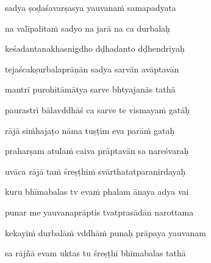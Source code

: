 sadya ṣoḍaśavarṣasya yauvana\.m samapadyata\thinspace{\dandab} \dontdisplaylinenum

na valīpalita\.m sadyo na jarā na ca durbalaḥ \veg\dontdisplaylinenum

keśadantanakhasnigdho dḍhadanto dḍhendriyaḥ\thinspace{\dandab} \dontdisplaylinenum

tejaścakṣurbalaprāṇān sadya sarvān avāptavān \veg\dontdisplaylinenum

mantrī purohitāmātya sarve bhtyajanās tathā\thinspace{\dandab} \dontdisplaylinenum

paurastrī bālavddhāś ca sarve te vismaya\.m gatāḥ \veg\dontdisplaylinenum

rājā si\.mhajaṭo nāma tuṣṭim eva parā\.m gataḥ\thinspace{\dandab} \dontdisplaylinenum

praharṣam atula\.m caiva prāptavān sa nareśvaraḥ \veg\dontdisplaylinenum

uvāca rājā ta\.m śreṣṭhi\.m svārthatatparanirdayaḥ\thinspace{\dandab} \dontdisplaylinenum

kuru bhīmabalas tv eva\.m phalam ānaya adya vai \veg\dontdisplaylinenum

punar me yauvanaprāptis tvatprasādān narottama\thinspace{\dandab} \dontdisplaylinenum

kekayī\.m durbalā\.m vddhā\.m punaḥ prāpaya yauvanam \veg\dontdisplaylinenum

sa rājñā evam uktas tu śreṣṭhī bhīmabalas tathā\thinspace{\dandab} \dontdisplaylinenum

